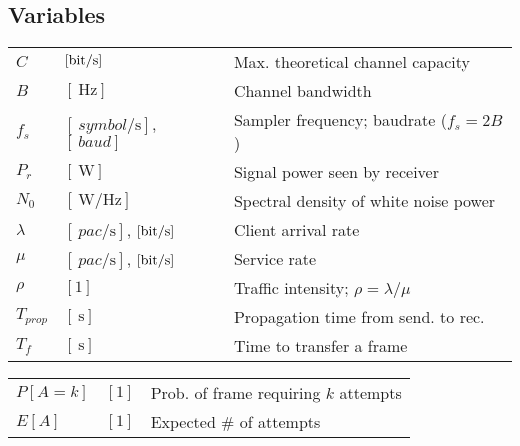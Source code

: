 \documentclass{form}
\begin{document}
\begin{center}
    \begin{minipage}{0.55\textwidth}
        \section*{Variables}
        \begin{tabular}{@{}l l | l@{}}
            $C$        & $[\SI{}{\bit/\second}  ]$ & Max. theoretical channel capacity                                        \\
            $B$        & $[\SI{}{\hertz}        ]$ & Channel bandwidth                                                        \\
            $f_s$      & $[\SI{}{symbol/\second}]$, $[\SI{}{baud}             ]$ & Sampler frequency; baudrate ($f_s=2 B$)    \\
            $P_r$      & $[\SI{}{\watt}         ]$ & Signal power seen by receiver                                            \\
            $N_0$      & $[\SI{}{\watt/\hertz}  ]$ & Spectral density of white noise power                                    \\
            $\lambda$  & $[\SI{}{pac /\second  }]$, $[\SI{}{\bit/\second     }]$ & Client arrival rate                        \\
            $\mu$      & $[\SI{}{pac /\second  }]$, $[\SI{}{\bit/\second     }]$ & Service rate                               \\
            $\rho$     & $[1                    ]$ & Traffic intensity; $\rho = \lambda/\mu$                                  \\
            $T_{prop}$ & $[\SI{}{\second}       ]$ & Propagation time from send. to rec.                                      \\
            $T_f$      & $[\SI{}{\second}       ]$ & Time to transfer a frame                                                 \\
        \end{tabular}
    \end{minipage}
    \begin{minipage}{0.44\textwidth}
        \begin{tabular}{@{}l l | l@{}}
            $P[A=k]$   & $[1                    ]$ & Prob. of frame requiring $k$ attempts                                    \\
            $E[A]$     & $[1                    ]$ & Expected \# of attempts                                                  \\

\end{tabular}
\end{minipage}
\end{center}
\end{document}

